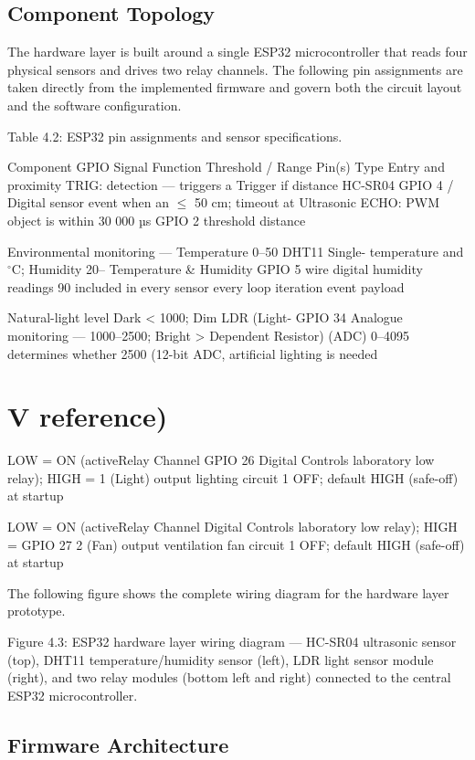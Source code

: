 \subsection{Component Topology}


The hardware layer is built around a single ESP32 microcontroller that reads four
physical sensors and drives two relay channels. The following pin assignments are taken
directly from the implemented firmware and govern both the circuit layout and the
software configuration.


Table 4.2: ESP32 pin assignments and sensor specifications.


Component GPIO Signal Function Threshold / Range
Pin(s) Type
Entry and proximity
TRIG: detection --- triggers a Trigger if distance
HC-SR04 GPIO 4 / Digital
sensor event when an $\le$ 50 cm; timeout at
Ultrasonic ECHO: PWM
object is within 30 000 µs
GPIO 2 threshold distance

Environmental
monitoring --- Temperature 0--50
DHT11 Single-
temperature and $^\circ$C; Humidity 20--
Temperature
\& Humidity
GPIO 5 wire
digital
humidity readings 90%
included in every sensor every loop iteration
event payload

Natural-light level
Dark < 1000; Dim
LDR (Light-
GPIO 34 Analogue monitoring ---
1000--2500; Bright >
Dependent
Resistor)
(ADC) 0--4095 determines whether
2500 (12-bit ADC,
artificial lighting is
needed
\section{V reference)}

LOW = ON (activeRelay Channel
GPIO 26
Digital Controls laboratory low relay); HIGH =
1 (Light) output lighting circuit 1 OFF; default HIGH
(safe-off) at startup

LOW = ON (activeRelay Channel Digital Controls laboratory low relay); HIGH =
GPIO 27
2 (Fan) output ventilation fan circuit 1 OFF; default HIGH
(safe-off) at startup

The following figure shows the complete wiring diagram for the hardware layer
prototype.




Figure 4.3: ESP32 hardware layer wiring diagram --- HC-SR04 ultrasonic sensor (top),
DHT11 temperature/humidity sensor (left), LDR light sensor module (right), and two relay
modules (bottom left and right) connected to the central ESP32 microcontroller.

\subsection{Firmware Architecture}


